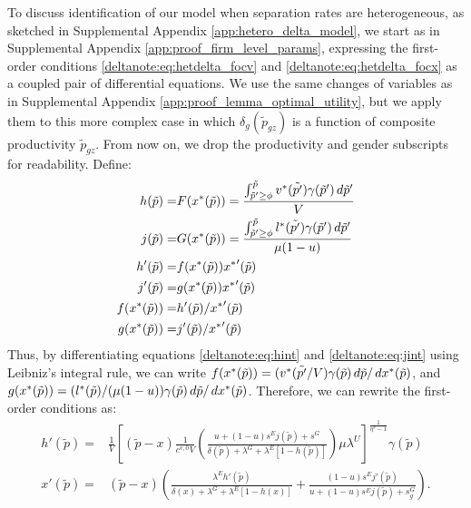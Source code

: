 To discuss identification of our model when separation rates are heterogeneous, as sketched in Supplemental Appendix \ref{app:hetero_delta_model}, we start as in Supplemental Appendix \ref{app:proof_firm_level_params}, expressing the first-order conditions \eqref{deltanote:eq:hetdelta_focv} and \eqref{deltanote:eq:hetdelta_focx} as a coupled pair of differential equations. We use the same changes of variables as in Supplemental Appendix \ref{app:proof_lemma_optimal_utility}, but we apply them to this more complex case in which $\delta_{g}(\tilde{p}_{gz})$ is a function of composite productivity $\tilde{p}_{gz}$. From now on, we drop the productivity and gender subscripts for readability. Define:
%
\begin{align}
    h(\tilde{p}) = & F(x^{*}(\tilde{p})) = \frac{\int_{\tilde{p}' \geq \phi}^{\tilde{p}} v^{*}(\tilde{p'}) \gamma(\tilde{p}') \mathop{}\!{d} \tilde{p}'}{V} \label{deltanote:eq:hint} \\
    j(\tilde{p}) = & G(x^{*}(\tilde{p})) = \frac{\int_{\tilde{p}' \geq \phi}^{\tilde{p}} l^{*}(\tilde{p'}) \gamma(\tilde{p}') \mathop{}\!{d} \tilde{p}'}{\mu (1 - u)} \label{deltanote:eq:jint} \\
    h'(\tilde{p}) = & f(x^{*}(\tilde{p})) {x^{*}}'(\tilde{p}) \\
    j'(\tilde{p}) = & g(x^{*}(\tilde{p})) {x^{*}}'(\tilde{p}) \\
    f(x^{*}(\tilde{p})) = & h'(\tilde{p}) / {x^{*}}'(\tilde{p}) \\
    g(x^{*}(\tilde{p})) = & j'(\tilde{p}) / {x^{*}}'(\tilde{p})
\end{align}
%
Thus, by differentiating equations \eqref{deltanote:eq:hint} and \eqref{deltanote:eq:jint} using Leibniz's integral rule, we can write $f(x^{*}(\tilde{p})) = (v^{*}(\tilde{p'}/V) \gamma(\tilde{p}) \mathop{}\!{d} \tilde{p}/\mathop{}\!{d} x^{*}(\tilde{p})$, and $g(x^{*}(\tilde{p})) = (l^{*}(\tilde{p})/(\mu (1-u)) \gamma(\tilde{p}) \mathop{}\!{d} \tilde{p}/\mathop{}\!{d} x^{*}(\tilde{p})$. Therefore, we can rewrite the first-order conditions as:
\begin{align}
    h'(\tilde{p}) = & \frac{1}{V} \left[ (\tilde{p} - x) \frac{1}{c^{v,0} V} \left( \frac{ u + (1 - u) s^{E} j(\tilde{p}) + s^{G} }{\delta(\tilde{p}) + \lambda^{G} + \lambda^{E} \left[1 - h(\tilde{p})\right]} \right)  \mu \lambda^{U}\right]^{\frac{1}{\eta^{v} - 1}} \gamma(\tilde{p})  \label{deltanote:eq:hint_mod} \\
    x'(\tilde{p}) = & (\tilde{p} - x) \left( \frac{\lambda^{E} h'(\tilde{p})}{ \delta(x) + \lambda^{G} + \lambda^{E} \left[1 - h(x)\right] } + \frac{ (1 - u) s^{E} j'(\tilde{p}) }{ u + (1 - u) s^{E} j(\tilde{p}) + s_{g}^{G} } \right). \label{deltanote:eq:xint_mod}
\end{align}
